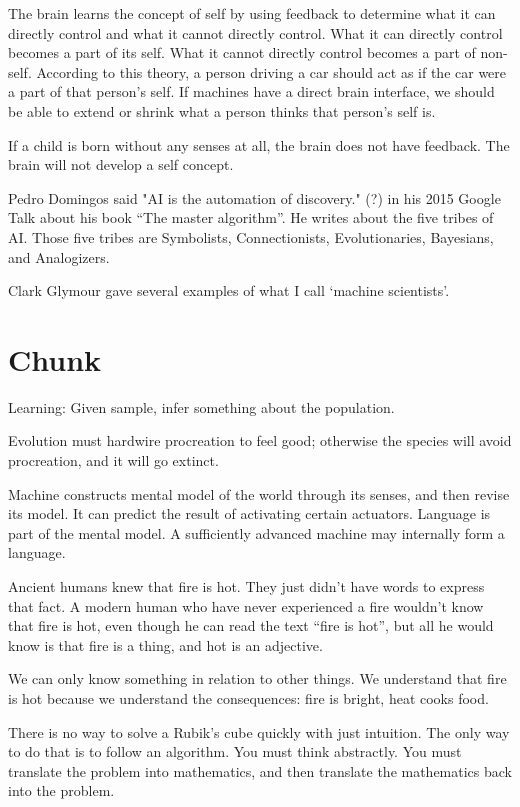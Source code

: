 The brain learns the concept of self by using feedback
to determine what it can directly control
and what it cannot directly control.
What it can directly control becomes a part of its self.
What it cannot directly control becomes a part of non-self.
According to this theory, a person driving a car
should act as if the car were a part of that person's self.
If machines have a direct brain interface,
we should be able to extend or shrink what a person thinks that person's self is.

If a child is born without any senses at all,
the brain does not have feedback.
The brain will not develop a self concept.

Pedro Domingos said
"AI is the automation of discovery." (?)
in his 2015 Google Talk about his book ``The master algorithm''.
He writes about the five tribes of AI.
Those five tribes are Symbolists, Connectionists, Evolutionaries, Bayesians, and Analogizers.

Clark Glymour gave several examples of what I call `machine scientists'.
\cite{GlyAutoDisc}

\section{Chunk}

Learning:
Given sample, infer something about the population.

Evolution must hardwire procreation to feel good;
otherwise the species will avoid procreation,
and it will go extinct.

Machine constructs mental model of the world through its senses,
and then revise its model.
It can predict the result of activating certain actuators.
Language is part of the mental model.
A sufficiently advanced machine may internally form a language.

Ancient humans knew that fire is hot.
They just didn't have words to express that fact.
A modern human who have never experienced a fire
wouldn't know that fire is hot,
even though he can read the text ``fire is hot'',
but all he would know is that fire is a thing, and hot is an adjective.

We can only know something in relation to other things.
We understand that fire is hot because we understand the consequences:
fire is bright, heat cooks food.

There is no way to solve a Rubik's cube quickly with just intuition.
The only way to do that is to follow an algorithm.
You must think abstractly.
You must translate the problem into mathematics,
and then translate the mathematics back into the problem.

